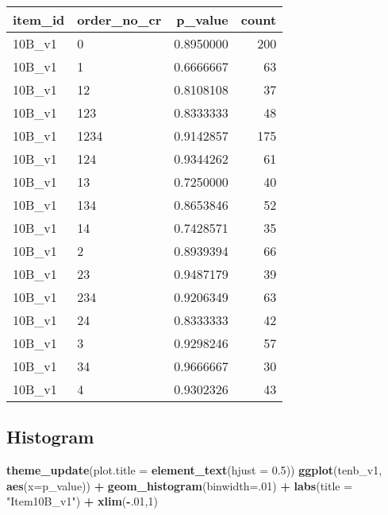 \documentclass[]{book}
\newenvironment{Shaded}{\begin{snugshade}}{\end{snugshade}}
\newcommand{\KeywordTok}[1]{\textcolor[rgb]{0.13,0.29,0.53}{\textbf{#1}}}
\newcommand{\DataTypeTok}[1]{\textcolor[rgb]{0.13,0.29,0.53}{#1}}
\newcommand{\DecValTok}[1]{\textcolor[rgb]{0.00,0.00,0.81}{#1}}
\newcommand{\FloatTok}[1]{\textcolor[rgb]{0.00,0.00,0.81}{#1}}
\newcommand{\StringTok}[1]{\textcolor[rgb]{0.31,0.60,0.02}{#1}}
\newcommand{\OperatorTok}[1]{\textcolor[rgb]{0.81,0.36,0.00}{\textbf{#1}}}
\newcommand{\NormalTok}[1]{#1}
\theoremstyle{definition}
\theoremstyle{definition}
\theoremstyle{definition}
\theoremstyle{remark}
\begin{document}
\begin{tabular}{l|l|r|r}
\hline
item\_id & order\_no\_cr & p\_value & count\\
\hline
10B\_v1 & 0 & 0.8950000 & 200\\
\hline
10B\_v1 & 1 & 0.6666667 & 63\\
\hline
10B\_v1 & 12 & 0.8108108 & 37\\
\hline
10B\_v1 & 123 & 0.8333333 & 48\\
\hline
10B\_v1 & 1234 & 0.9142857 & 175\\
\hline
10B\_v1 & 124 & 0.9344262 & 61\\
\hline
10B\_v1 & 13 & 0.7250000 & 40\\
\hline
10B\_v1 & 134 & 0.8653846 & 52\\
\hline
10B\_v1 & 14 & 0.7428571 & 35\\
\hline
10B\_v1 & 2 & 0.8939394 & 66\\
\hline
10B\_v1 & 23 & 0.9487179 & 39\\
\hline
10B\_v1 & 234 & 0.9206349 & 63\\
\hline
10B\_v1 & 24 & 0.8333333 & 42\\
\hline
10B\_v1 & 3 & 0.9298246 & 57\\
\hline
10B\_v1 & 34 & 0.9666667 & 30\\
\hline
10B\_v1 & 4 & 0.9302326 & 43\\
\hline
\end{tabular}

\subsection{Histogram}\label{histogram-4}

\begin{Shaded}
\begin{Highlighting}[]
\KeywordTok{theme_update}\NormalTok{(}\DataTypeTok{plot.title =} \KeywordTok{element_text}\NormalTok{(}\DataTypeTok{hjust =} \FloatTok{0.5}\NormalTok{))}
\KeywordTok{ggplot}\NormalTok{(tenb_v1, }\KeywordTok{aes}\NormalTok{(}\DataTypeTok{x=}\NormalTok{p_value)) }\OperatorTok{+}\StringTok{ }\KeywordTok{geom_histogram}\NormalTok{(}\DataTypeTok{binwidth=}\NormalTok{.}\DecValTok{01}\NormalTok{) }\OperatorTok{+}\StringTok{ }\KeywordTok{labs}\NormalTok{(}\DataTypeTok{title =} \StringTok{"Item10B_v1"}\NormalTok{) }\OperatorTok{+}\StringTok{ }\KeywordTok{xlim}\NormalTok{(}\OperatorTok{-}\NormalTok{.}\DecValTok{01}\NormalTok{,}\DecValTok{1}\NormalTok{)}
\end{Highlighting}
\end{Shaded}
\end{document}
